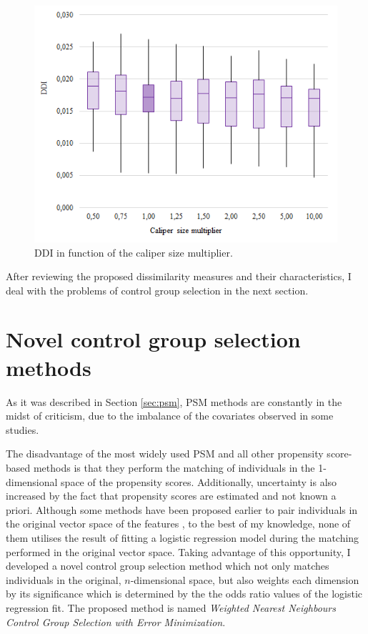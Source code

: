 		\begin{figure}[h]
			\centering
			\captionsetup{justification=centering}
			\includegraphics[width=0.6\linewidth]{assets/figures/control_group_selection/measures/ddi_vs_caliper.png}
			\caption{DDI in function of the caliper size multiplier.}
			\label{fig:ddi_vs_caliper}
		\end{figure}
						  
		
		After reviewing the proposed dissimilarity measures and their characteristics, I deal with the problems of control group selection in the next section.
										
		\section{Novel control group selection methods}
		\label{sec:methods}
										
		As it was described in Section \ref{sec:psm}, PSM methods are constantly in the midst of criticism, due to the imbalance of the covariates observed in some studies.
										
		The disadvantage of the most widely used PSM and all other propensity score-based methods is that they perform the matching of individuals in the 1-dimensional space of the propensity scores. Additionally, uncertainty is also increased by the fact that propensity scores are estimated and not known a priori. Although some methods have been proposed earlier to pair individuals in the original vector space of the features \cite{cochran1973controlling, rubin1976multivariate, rubin1980bias}, to the best of my knowledge, none of them utilises the result of fitting a logistic regression model during the matching performed in the original vector space. Taking advantage of this opportunity, I developed a novel control group selection method which not only matches individuals in the original, $n$-dimensional space, but also weights each dimension by its significance which is determined by the the odds ratio values of the logistic regression fit. The proposed method is named \textit{Weighted Nearest Neighbours Control Group Selection with Error Minimization}.
										
